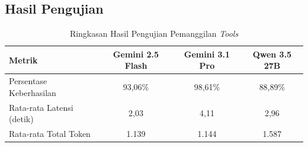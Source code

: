 \subsection{Hasil Pengujian}

\begin{table}[H]
\centering
\caption{Ringkasan Hasil Pengujian Pemanggilan \textit{Tools}}
\label{tab:tools_summary}
\begin{tabular}{|l|c|c|c|}
\hline
\textbf{Metrik} & \textbf{Gemini 2.5 Flash} & \textbf{Gemini 3.1 Pro} & \textbf{Qwen 3.5 27B} \\
\hline
Persentase Keberhasilan & 93,06\% & 98,61\% & 88,89\% \\
\hline
Rata-rata Latensi (detik) & 2,03 & 4,11 & 2,96 \\
\hline
Rata-rata Total Token & 1.139 & 1.144 & 1.587 \\
\hline
\end{tabular}
\end{table}

